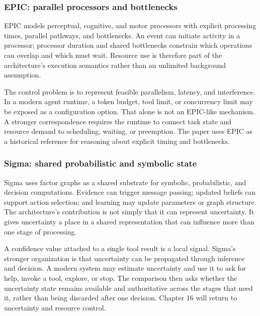 \subsubsection{EPIC: parallel processors and bottlenecks}

EPIC models perceptual, cognitive, and motor processors with explicit processing times, parallel pathways, and bottlenecks. An event can initiate activity in a processor; processor duration and shared bottlenecks constrain which operations can overlap and which must wait. Resource use is therefore part of the architecture's execution semantics rather than an unlimited background assumption.

The control problem is to represent feasible parallelism, latency, and interference. In a modern agent runtime, a token budget, tool limit, or concurrency limit may be exposed as a configuration option. That alone is not an EPIC-like mechanism. A stronger correspondence requires the runtime to connect task state and resource demand to scheduling, waiting, or preemption. The paper uses EPIC as a historical reference for reasoning about explicit timing and bottlenecks.

\subsubsection{Sigma: shared probabilistic and symbolic state}

Sigma uses factor graphs as a shared substrate for symbolic, probabilistic, and decision computations. Evidence can trigger message passing; updated beliefs can support action selection; and learning may update parameters or graph structure. The architecture's contribution is not simply that it can represent uncertainty. It gives uncertainty a place in a shared representation that can influence more than one stage of processing.

A confidence value attached to a single tool result is a local signal. Sigma's stronger organization is that uncertainty can be propagated through inference and decision. A modern system may estimate uncertainty and use it to ask for help, invoke a tool, explore, or stop. The comparison then asks whether the uncertainty state remains available and authoritative across the stages that need it, rather than being discarded after one decision. Chapter 16 will return to uncertainty and resource control.

